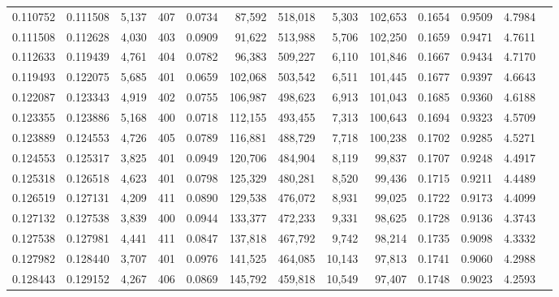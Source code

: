 \begin{tabular}{rrrrrrrrrrrrr}
0.110752 & 0.111508 & 5,137 & 407 &                                     0.0734 &  87,592 & 518,018 &   5,303 & 102,653 & 0.1654 & 0.9509 & 4.7984 \\
0.111508 & 0.112628 & 4,030 & 403 &                                     0.0909 &  91,622 & 513,988 &   5,706 & 102,250 & 0.1659 & 0.9471 & 4.7611 \\
0.112633 & 0.119439 & 4,761 & 404 &                                     0.0782 &  96,383 & 509,227 &   6,110 & 101,846 & 0.1667 & 0.9434 & 4.7170 \\
0.119493 & 0.122075 & 5,685 & 401 &                                     0.0659 & 102,068 & 503,542 &   6,511 & 101,445 & 0.1677 & 0.9397 & 4.6643 \\
0.122087 & 0.123343 & 4,919 & 402 &                                     0.0755 & 106,987 & 498,623 &   6,913 & 101,043 & 0.1685 & 0.9360 & 4.6188 \\
0.123355 & 0.123886 & 5,168 & 400 &                                     0.0718 & 112,155 & 493,455 &   7,313 & 100,643 & 0.1694 & 0.9323 & 4.5709 \\
0.123889 & 0.124553 & 4,726 & 405 &                                     0.0789 & 116,881 & 488,729 &   7,718 & 100,238 & 0.1702 & 0.9285 & 4.5271 \\
0.124553 & 0.125317 & 3,825 & 401 &                                     0.0949 & 120,706 & 484,904 &   8,119 &  99,837 & 0.1707 & 0.9248 & 4.4917 \\
0.125318 & 0.126518 & 4,623 & 401 &                                     0.0798 & 125,329 & 480,281 &   8,520 &  99,436 & 0.1715 & 0.9211 & 4.4489 \\
0.126519 & 0.127131 & 4,209 & 411 &                                     0.0890 & 129,538 & 476,072 &   8,931 &  99,025 & 0.1722 & 0.9173 & 4.4099 \\
0.127132 & 0.127538 & 3,839 & 400 &                                     0.0944 & 133,377 & 472,233 &   9,331 &  98,625 & 0.1728 & 0.9136 & 4.3743 \\
0.127538 & 0.127981 & 4,441 & 411 &                                     0.0847 & 137,818 & 467,792 &   9,742 &  98,214 & 0.1735 & 0.9098 & 4.3332 \\
0.127982 & 0.128440 & 3,707 & 401 &                                     0.0976 & 141,525 & 464,085 &  10,143 &  97,813 & 0.1741 & 0.9060 & 4.2988 \\
0.128443 & 0.129152 & 4,267 & 406 &                                     0.0869 & 145,792 & 459,818 &  10,549 &  97,407 & 0.1748 & 0.9023 & 4.2593 \\

\end{tabular}
